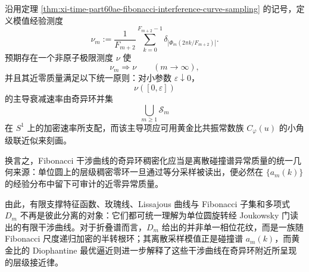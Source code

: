 \begin{conjecture}[奇异环稠密化诱导碰撞谱异常质量]\label{conj:xi-time-part60ae-singular-ring-densification-collision-anomaly}
沿用定理 \ref{thm:xi-time-part60ae-fibonacci-interference-curve-sampling} 的记号，定义模值经验测度
\[
\nu_m:=
\frac{1}{F_{m+2}}
\sum_{k=0}^{F_{m+2}-1}
\delta_{\left|\Phi_m(2\pi k/F_{m+2})\right|}.
\]
预期存在一个非原子极限测度 \(\nu\) 使
\[
\nu_m\Rightarrow \nu
\qquad (m\to\infty),
\]
并且其近零质量满足以下统一原则：对小参数 \(\varepsilon\downarrow 0\)，
\[
\nu([0,\varepsilon])
\]
的主导衰减速率由奇异环并集
\[
\bigcup_{m\ge 1}\mathcal S_m
\]
在 \(S^1\) 上的加密速率所支配，而该主导项应可用黄金比共振常数族 \(C_{\varphi}(u)\) 的小角级联近似来刻画。

换言之，Fibonacci 干涉曲线的奇异环稠密化应当是离散碰撞谱异常质量的统一几何来源：单位圆上的层级稠密零环一旦通过等分采样被读出，便必然在 \(\{a_m(k)\}\) 的经验分布中留下可审计的近零异常质量。
\end{conjecture}

\noindent
由此，有限支撑特征函数、玫瑰线、Lissajous 曲线与 Fibonacci 子集和多项式 \(D_m\) 不再是彼此分离的对象：它们都可统一理解为单位圆旋转经 Joukowsky 门读出的有限干涉曲线。对于折叠谱而言，\(D_m\) 给出的并非单一相位花纹，而是一族随 Fibonacci 尺度递归加密的半转根环；其离散采样模值正是碰撞谱 \(a_m(k)\)，而黄金比的 Diophantine 最优逼近则进一步解释了这些干涉曲线在奇异环附近所呈现的层级接近律。

\endinput

